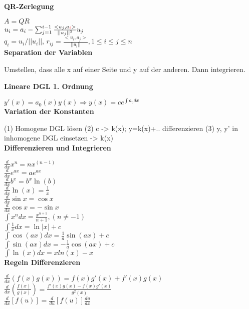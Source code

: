\documentclass[10pt,twocolumn,a4paper]{article}
\begin{document}
\begin{flushleft}
\textbf{QR-Zerlegung}

$A = QR$\\
$u_i = a_i - \sum_{j=1}^{i-1} \frac{<u_j, a_{\textcolor{red}{i}}>}{||u_j||^2}u_j$\\
$q_i = u_i / ||u_i||$, $r_{ij} = \frac{<u_i, a_j>}{||u_i||}, 1 \leq i \leq j \leq n$\\

\textbf{Separation der Variablen}

Umstellen, dass alle x auf einer Seite und y auf der anderen. Dann integrieren.

\textbf{Lineare DGL 1. Ordnung}

$y'(x)=a_0(x)y(x) \Rightarrow y(x) = ce^{\int{a_0}dx}$\\

\textbf{Variation der Konstanten}

(1) Homogene DGL lösen (2) c -> k(x); y=k(x)+.. differenzieren (3) y, y' in inhomogene DGL einsetzen -> k(x)\\


\textbf{Differenzieren und Integrieren}

$\frac{d}{{dx}}x^n  = nx^{\left( {n - 1} \right)}$\\
$\frac{d}{{dx}}e^{ax}  = ae^{ax}$\\
$\frac{d}{{dx}}b^x  = b^x \ln \left( b \right)$\\
$\frac{d}{{dx}}\ln \left( x \right) = \frac{1}{x}$\\
$\frac{d}{{dx}}\sin x = \cos x$\\
$\frac{d}{{dx}}\cos x =  - \sin x$\\

$\int {x^n } dx = \frac{{x^{n + 1} }}{{n + 1}},(n \ne  - 1)$\\
$\int {\frac{1}{x}} dx = \ln \left| x \right| + c$\\
$\int {\cos (ax)} dx = \frac{1}{a}\sin (ax) + c$\\
$\int {\sin (ax)} dx =  - \frac{1}{a}\cos (ax) + c$\\
$\int {\ln (x)} dx = x ln(x) -x$\\

\textbf{Regeln Differenzieren}

$\frac{d}{{dx}}\left( {f\left( x \right)g\left( x \right)} \right) = f\left( x \right)g'\left( x \right) + f'\left( x \right)g\left( x \right)$\\
$\frac{d}{{dx}}\left( {\frac{{f\left( x \right)}}{{g\left( x \right)}}} \right) = \frac{{f'\left( x \right)g\left( x \right) - f\left( x \right)g'\left( x \right)}}{{g^2 \left( x \right)}}$\\
$\frac{d}{{dx}}\left[ {f\left( u \right)} \right] = \frac{d}{{du}}\left[ {f\left( u \right)} \right]\frac{{du}}{{dx}}$\\


\end{flushleft}
\end{document}
